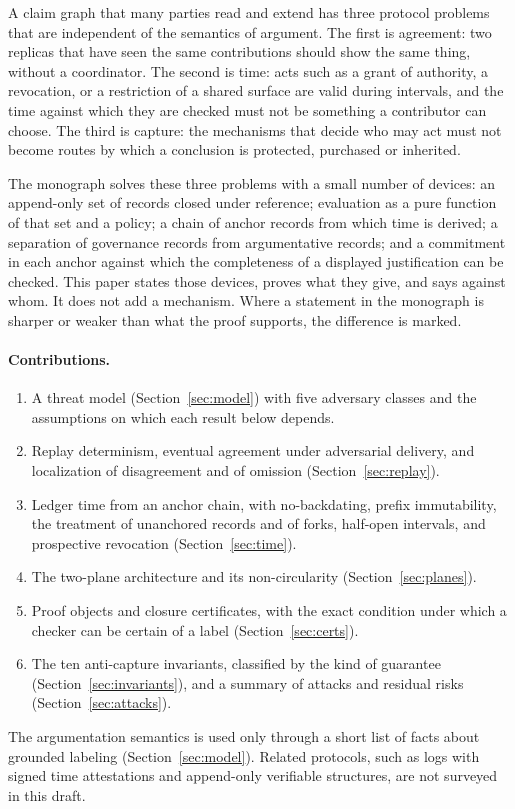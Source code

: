 \documentclass[11pt]{article}
\theoremstyle{plain}
\theoremstyle{definition}
\theoremstyle{remark}
\begin{document}
A claim graph that many parties read and extend has three protocol problems that are independent of the semantics of argument. The first is agreement: two replicas that have seen the same contributions should show the same thing, without a coordinator. The second is time: acts such as a grant of authority, a revocation, or a restriction of a shared surface are valid during intervals, and the time against which they are checked must not be something a contributor can choose. The third is capture: the mechanisms that decide who may act must not become routes by which a conclusion is protected, purchased or inherited.

The monograph solves these three problems with a small number of devices: an append-only set of records closed under reference; evaluation as a pure function of that set and a policy; a chain of anchor records from which time is derived; a separation of governance records from argumentative records; and a commitment in each anchor against which the completeness of a displayed justification can be checked. This paper states those devices, proves what they give, and says against whom. It does not add a mechanism. Where a statement in the monograph is sharper or weaker than what the proof supports, the difference is marked.

\paragraph{Contributions.}
\begin{enumerate}[label=(\arabic*),nosep]
\item A threat model (Section~\ref{sec:model}) with five adversary classes and the assumptions on which each result below depends.
\item Replay determinism, eventual agreement under adversarial delivery, and localization of disagreement and of omission (Section~\ref{sec:replay}).
\item Ledger time from an anchor chain, with no-backdating, prefix immutability, the treatment of unanchored records and of forks, half-open intervals, and prospective revocation (Section~\ref{sec:time}).
\item The two-plane architecture and its non-circularity (Section~\ref{sec:planes}).
\item Proof objects and closure certificates, with the exact condition under which a checker can be certain of a label (Section~\ref{sec:certs}).
\item The ten anti-capture invariants, classified by the kind of guarantee (Section~\ref{sec:invariants}), and a summary of attacks and residual risks (Section~\ref{sec:attacks}).
\end{enumerate}
The argumentation semantics is used only through a short list of facts about grounded labeling (Section~\ref{sec:model}). Related protocols, such as logs with signed time attestations and append-only verifiable structures, are not surveyed in this draft.
\end{document}
